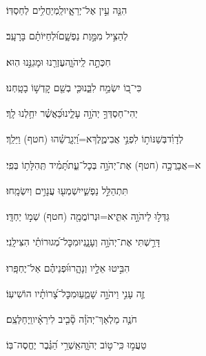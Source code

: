 \documentclass[12pt]{article}
\newcommand{\loc}[1]{\textsuperscript{\locf{#1}}}
\begin{document}
{\loc{ יח}~}‏הִנֵּ֤ה עֵ֣ין  אֶל־יְרֵאָ֑יו{\hfill}לַֽמְיַחֲלִ֥ים לְחַסְדּֽוֹ׃\par

{\loc{ יט}~}‏לְהַצִּ֣יל מִמָּ֣וֶת נַפְשָׁ֑ם{\hfill}וּ֝לְחַיּוֹתָ֗ם בָּרָעָֽב׃\par

{\loc{ כ}~}‏ חִכְּתָ֣ה לַֽיהֹוָ֑ה{\hfill}עֶזְרֵ֖נוּ וּמָגִנֵּ֣נוּ הֽוּא׃\par

{\loc{ כא}~}‏כִּי־ב֭וֹ יִשְׂמַ֣ח לִבֵּ֑נוּ{\hfill}כִּ֤י בְשֵׁ֖ם קׇדְשׁ֣וֹ בָטָֽחְנוּ׃\par

{\loc{ כב}~}‏יְהִי־חַסְדְּךָ֣ יְהֹוָ֣ה עָלֵ֑ינוּ{\hfill}כַּ֝אֲשֶׁ֗ר יִחַ֥לְנוּ לָֽךְ׃\par\pend
\ledpb
\pstart[\subsection*{\textcolor{red}{פרק לד}}]\label{פרק לד}
{\loc{ א}~}‏לְדָוִ֗ד\newline\hspace*{.5em}בְּשַׁנּוֹת֣וֹ  לִפְנֵ֣י אֲבִימֶ֑לֶךְ{\hfill}א=וַ֝יְגָרֲשֵׁ֗הוּ (חטף) וַיֵּלַֽךְ׃\par

{\loc{ ב}~}‏א=אֲבָרֲכָ֣ה (חטף) אֶת־יְהֹוָ֣ה בְּכׇל־עֵ֑ת{\hfill}תָּ֝מִ֗יד תְּֽהִלָּת֥וֹ בְּפִֽי׃\par

{\loc{ ג}~}‏ תִּתְהַלֵּ֣ל נַפְשִׁ֑י{\hfill}יִשְׁמְע֖וּ עֲנָוִ֣ים וְיִשְׂמָֽחוּ׃\par

{\loc{ ד}~}‏גַּדְּל֣וּ לַיהֹוָ֣ה אִתִּ֑י{\hfill}א=וּנְרוֹמֲמָ֖ה (חטף) שְׁמ֣וֹ יַחְדָּֽו׃\par

{\loc{ ה}~}‏דָּרַ֣שְׁתִּי אֶת־יְהֹוָ֣ה וְעָנָ֑נִי{\hfill}וּמִכׇּל־מְ֝גוּרוֹתַ֗י הִצִּילָֽנִי׃\par

{\loc{ ו}~}‏הִבִּ֣יטוּ אֵלָ֣יו וְנָהָ֑רוּ{\hfill}וּ֝פְנֵיהֶ֗ם אַל־יֶחְפָּֽרוּ׃\par

{\loc{ ז}~}‏זֶ֤ה עָנִ֣י  וַיהֹוָ֣ה שָׁמֵ֑עַ{\hfill}וּמִכׇּל־צָ֝רוֹתָ֗יו הוֹשִׁיעֽוֹ׃\par

{\loc{ ח}~}‏חֹנֶ֤ה מַלְאַךְ־יְהֹוָ֓ה סָ֘בִ֤יב לִירֵאָ֗יו{\hfill}וַֽיְחַלְּצֵֽם׃\par

{\loc{ ט}~}‏טַעֲמ֣וּ  כִּֽי־ט֣וֹב יְהֹוָ֑ה{\hfill}אַֽשְׁרֵ֥י הַ֝גֶּ֗בֶר יֶחֱסֶה־בּֽוֹ׃\par
\end{document}
